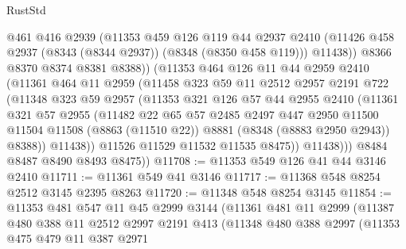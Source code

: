 \begin{lexlean}{RustStd}
\begin{coremodule}
                  @461
                  @416
                  @2939
                  (@11353
                    @459
                    @126
                    @119
                    @44
                    @2937
                    @2410
                    (@11426 @458 @2937 (@8343 (@8344 @2937)) (@8348 (@8350 @458 @119)))
                    @11438))
                @8366
                @8370
                @8374
                @8381
                @8388))
            (@11353
              @464
              @126
              @11
              @44
              @2959
              @2410
              (@11361
                @464
                @11
                @2959
                (@11458
                  @323
                  @59
                  @11
                  @2512
                  @2957
                  @2191
                  @722
                  (@11348
                    @323
                    @59
                    @2957
                    (@11353
                      @321
                      @126
                      @57
                      @44
                      @2955
                      @2410
                      (@11361
                        @321
                        @57
                        @2955
                        (@11482
                          @22
                          @65
                          @57
                          @2485
                          @2497
                          @447
                          @2950
                          @11500
                          @11504
                          @11508
                          (@8863 (@11510 @22))
                          @8881
                          (@8348 (@8883 @2950 @2943))
                          @8388))
                      @11438))
                  @11526
                  @11529
                  @11532
                  @11535
                  @8475))
              @11438)))
        @8484
        @8487
        @8490
        @8493
        @8475))
@11708 := @11353 @549 @126 @41 @44 @3146 @2410
@11711 := @11361 @549 @41 @3146
@11717 := @11368 @548 @8254 @2512 @3145 @2395 @8263
@11720 := @11348 @548 @8254 @3145
@11854 := @11353
    @481
    @547
    @11
    @45
    @2999
    @3144
    (@11361
      @481
      @11
      @2999
      (@11387
        @480
        @388
        @11
        @2512
        @2997
        @2191
        @413
        (@11348
          @480
          @388
          @2997
          (@11353
            @475
            @479
            @11
            @387
            @2971

\end{coremodule}
\end{lexlean}
